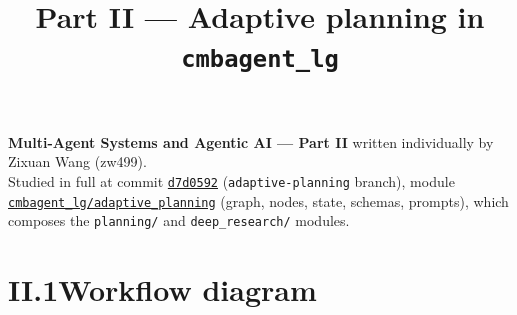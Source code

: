 \documentclass[11pt]{article}
\title{\vspace{-1.5em}Part II --- Adaptive planning in \texttt{cmbagent\_lg}}
\author{}
\date{}
\begin{document}
\maketitle
\vspace{-3em}

\noindent\textbf{Multi-Agent Systems and Agentic AI --- Part II} \quad written individually by Zixuan Wang (zw499).\\
Studied in full at commit \href{https://github.com/borisbolliet/cmbagent_lg/tree/d7d0592a714e4cc01c97f1b77afdd57a208b18db}{\texttt{d7d0592}}
(\texttt{adaptive-planning} branch), module \href{https://github.com/borisbolliet/cmbagent_lg/tree/d7d0592a714e4cc01c97f1b77afdd57a208b18db/cmbagent_lg/adaptive_planning}{\texttt{cmbagent\_lg/adaptive\_planning}}
(graph, nodes, state, schemas, prompts), which composes the \texttt{planning/} and \texttt{deep\_research/} modules.

\section*{II.1\quad Workflow diagram}
\end{document}
